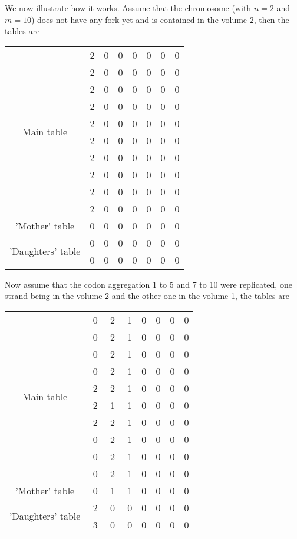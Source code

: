 We now illustrate how it works. Assume that the chromosome (with $n=2$ and $m=10$) does not have any fork yet and is contained in the volume 2, then the tables are
\begin{center}
  \begin{tabular}{|c|r|r|r|r|r|r|r|}
     \hline
     \multirow{10}{*}{Main table} & 2 & 0 & 0 & 0 & 0 & 0 & 0 \\
     & 2 & 0 & 0 & 0 & 0 & 0 & 0 \\
     & 2 & 0 & 0 & 0 & 0 & 0 & 0 \\
     & 2 & 0 & 0 & 0 & 0 & 0 & 0 \\
     & 2 & 0 & 0 & 0 & 0 & 0 & 0 \\
     & 2 & 0 & 0 & 0 & 0 & 0 & 0 \\
     & 2 & 0 & 0 & 0 & 0 & 0 & 0 \\
     & 2 & 0 & 0 & 0 & 0 & 0 & 0 \\
     & 2 & 0 & 0 & 0 & 0 & 0 & 0 \\
     & 2 & 0 & 0 & 0 & 0 & 0 & 0 \\
     \hline \hline
     'Mother' table & 0 & 0 & 0 & 0 & 0 & 0 & 0 \\
     \hline \hline
     \multirow{2}{*}{'Daughters' table} & 0 & 0 & 0 & 0 & 0 & 0 & 0 \\
     & 0 & 0 & 0 & 0 & 0 & 0 & 0 \\
     \hline
   \end{tabular}
\end{center}
Now assume that the codon aggregation 1 to 5 and 7 to 10 were replicated, one strand being in the volume 2 and the other one in the volume 1, the tables are
\begin{center}
  \begin{tabular}{|c|r|r|r|r|r|r|r|}
     \hline
     \multirow{10}{*}{Main table} & 0 &  2 &  1 & 0 & 0 & 0 & 0 \\
     &  0 &  2 &  1 & 0 & 0 & 0 & 0 \\
     &  0 &  2 &  1 & 0 & 0 & 0 & 0 \\
     &  0 &  2 &  1 & 0 & 0 & 0 & 0 \\
     & -2 &  2 &  1 & 0 & 0 & 0 & 0 \\
     &  2 & -1 & -1 & 0 & 0 & 0 & 0 \\
     & -2 &  2 &  1 & 0 & 0 & 0 & 0 \\
     &  0 &  2 &  1 & 0 & 0 & 0 & 0 \\
     &  0 &  2 &  1 & 0 & 0 & 0 & 0 \\
     &  0 &  2 &  1 & 0 & 0 & 0 & 0 \\
     \hline \hline
     'Mother' table & 0 & 1 & 1 & 0 & 0 & 0 & 0 \\
     \hline \hline
     \multirow{2}{*}{'Daughters' table} & 2 & 0 & 0 & 0 & 0 & 0 & 0 \\
     & 3 & 0 & 0 & 0 & 0 & 0 & 0 \\
     \hline
   \end{tabular}
\end{center}
